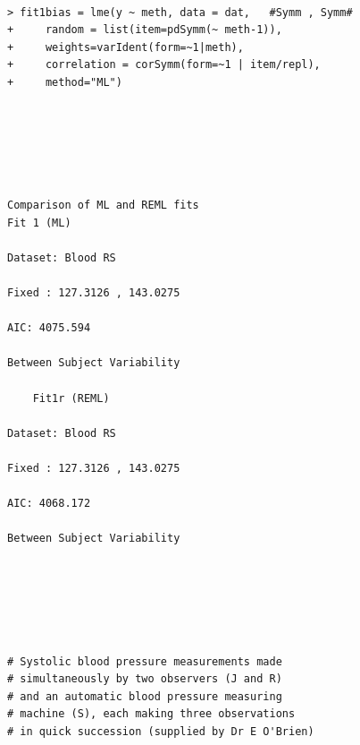 \documentclass[12pt, a4paper]{report}
\theoremstyle{plain}
\theoremstyle{definition}
\theoremstyle{remark}
\begin{document}
\begin{framed}
\begin{verbatim}

> fit1bias = lme(y ~ meth, data = dat,   #Symm , Symm#
+     random = list(item=pdSymm(~ meth-1)), 
+     weights=varIdent(form=~1|meth),
+     correlation = corSymm(form=~1 | item/repl), 
+     method="ML")



 
 

Comparison of ML and REML fits
Fit 1 (ML)

Dataset: Blood RS

Fixed : 127.3126 , 143.0275

AIC: 4075.594

Between Subject Variability

 	Fit1r (REML)

Dataset: Blood RS

Fixed : 127.3126 , 143.0275

AIC: 4068.172

Between Subject Variability

 

 


# Systolic blood pressure measurements made 
# simultaneously by two observers (J and R) 
# and an automatic blood pressure measuring
# machine (S), each making three observations 
# in quick succession (supplied by Dr E O'Brien)


\end{verbatim}
\end{framed}
\end{document}
